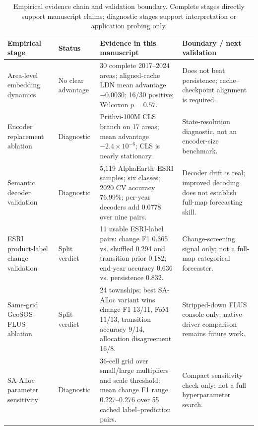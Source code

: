 \documentclass{article}
\begin{document}
\begin{table}[htbp]
\centering
\caption{Empirical evidence chain and validation boundary. Complete stages directly support manuscript claims; diagnostic stages support interpretation or application probing only.}
\label{tab:empirical_pipeline}
\scriptsize
\setlength{\tabcolsep}{2pt}
\renewcommand{\arraystretch}{0.92}
\begin{tabular}{@{}P{0.20\textwidth}P{0.11\textwidth}P{0.37\textwidth}P{0.26\textwidth}@{}}
\toprule
Empirical stage & Status & Evidence in this manuscript & Boundary / next validation \\
\midrule
Area-level embedding dynamics & No clear advantage & 30 complete 2017--2024 areas; aligned-cache LDN mean advantage $-0.0030$; 16/30 positive; Wilcoxon $p=0.57$. & Does not beat persistence; cache--checkpoint alignment is required. \\
Encoder replacement ablation & Diagnostic & Prithvi-100M CLS branch on 17 areas; mean advantage $-2.4\times 10^{-6}$; CLS is nearly stationary. & State-resolution diagnostic, not an encoder-size benchmark. \\
Semantic decoder validation & Diagnostic & 5,119 AlphaEarth--ESRI samples; six classes; 2020 CV accuracy 76.99\%; per-year decoders add 0.0778 over nine pairs. & Decoder drift is real; improved decoding does not establish full-map forecasting skill. \\
ESRI product-label change validation & Split verdict & 11 usable ESRI-label pairs: change F1 0.365 vs. shuffled 0.294 and transition prior 0.182; end-year accuracy 0.636 vs. persistence 0.832. & Change-screening signal only; not a full-map categorical forecaster. \\
Same-grid GeoSOS-FLUS ablation & Split verdict & 24 townships; best SA-Alloc variant wins change F1 13/11, FoM 11/13, transition accuracy 9/14, allocation disagreement 16/8. & Stripped-down FLUS console only; native-driver comparison remains future work. \\
SA-Alloc parameter sensitivity & Diagnostic & 36-cell grid over small/large multipliers and scale threshold; mean change F1 range 0.227--0.276 over 55 cached label--prediction pairs. & Compact sensitivity check only; not a full hyperparameter search. \\
\bottomrule
\end{tabular}
\renewcommand{\arraystretch}{1.0}
\end{table}


\end{document}
